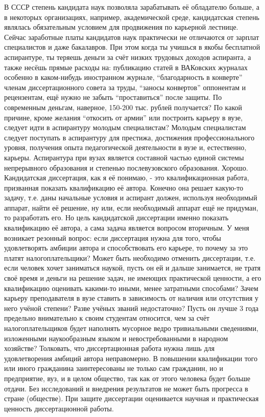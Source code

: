 \begin{drama}
	\maxspeaks В СССР степень кандидата наук позволяла зарабатывать её обладателю больше, а в некоторых организациях, например, академической среде, кандидатская степень являлась обязательным условием для продвижения по карьерной лестнице. Сейчас заработные платы кандидатов наук практически не отличаются от зарплат специалистов и даже бакалавров. При этом когда ты учишься в якобы бесплатной аспирантуре, ты теряешь деньги за счёт низких трудовых доходов аспиранта, а также несёшь прямые расходы на: публикацию статей в ВАКовских журналах особенно в каком-нибудь иностранном журнале, “благодарность в конверте” членам диссертационного совета за труды, “заносы конвертов” оппонентам и рецензентам, ещё нужно не забыть “проставиться” после защиты. По современным деньгам, наверное, 150-200 тыс. рублей получается? По какой причине, кроме желания “откосить от армии” или построить карьеру в вузе, следует идти в аспирантуру молодым специалистам?
	\michaelspeaks Молодым специалистам следует поступать в аспирантуру для престижа, достижения профессионального уровня, получения опыта педагогической деятельности в вузе и, естественно, карьеры. Аспирантура при вузах является составной частью единой системы непрерывного образования и степенью послевузовского образования.
	\maxspeaks Хорошо. Кандидатская диссертация, как я её понимаю, - это квалификационная работа, призванная показать квалификацию её автора. Конечно она решает какую-то задачу, т.е. даны начальные условия и аспирант должен, используя необходимый аппарат, найти её решение, ну или, если необходимый аппарат ещё не придуман, то разработать его. Но цель кандидатской диссертации именно показать квалификацию её автора, а сама задача является вопросом вторичным. У меня возникает резонный вопрос: если диссертация нужна для того, чтобы удовлетворять амбиции автора и способствовать его карьере, то почему за это платят налогоплательщики? Может быть необходимо отменить диссертации, т.е. если человек хочет заниматься наукой, пусть он ей и дальше занимается, не тратя своё время и деньги на решение задач, не имеющих практической ценности, а его квалификацию оценивать какими-то иными, менее затратными способами? Зачем карьеру преподавателя в вузе ставить в зависимость от наличия или отсутствия у него учёной степени? Разве учёных званий недостаточно? Пусть он лучше 3 года предельно внимательно к своим студентам относится, чем за счёт налогоплательщиков будет наполнять мусорное ведро тривиальными сведениями, изложенными наукообразным языком и невостребованными в народном хозяйстве?
	\michaelspeaks Толковать, что диссертационная работа нужна лишь для удовлетворения амбиций автора неправомерно. В повышении квалификации того или иного гражданина заинтересованы не только сам гражданин, но и предприятие, вуз, и в целом общество, так как от этого человека будет больше отдачи. Без исследований и внедрения результатов не может быть прогресса в стране (обществе). При защите диссертации оценивается научная и практическая ценность диссертационной работы.

\end{drama}
